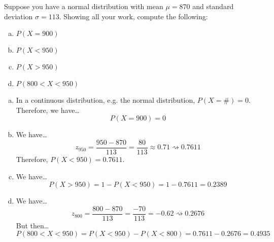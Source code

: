 \documentclass[11pt,letterpaper]{article}
\newcommand{\squiggle}{\rightsquigarrow}
\begin{document}
\newpage



 Suppose you have a normal distribution with mean $\mu= 870$ and standard deviation $\sigma= 113$. Showing all your work, compute the following:
	\begin{enumerate}[(a)]
	\item $P(X= 900)$
	\item $P(X < 950)$
	\item $P(X > 950)$
	\item $P(800 < X < 950)$
	\end{enumerate} \pspace

\sol 
\begin{enumerate}[(a)]
\item In a continuous distribution, e.g. the normal distribution, $P(X= \#)= 0$. Therefore, we have\dots
	\[
	P(X= 900)= 0 
	\] \pspace

\item We have\dots
	\[
	z_{950}= \dfrac{950 - 870}{113}= \dfrac{80}{113} \approx 0.71 \squiggle 0.7611
	\]
Therefore, $P(X < 950)= 0.7611$. \pspace

\item We have\dots
	\[
	P(X > 950)= 1 - P(X < 950)= 1 - 0.7611= 0.2389
	\] \pspace

\item We have\dots
	\[
	z_{800}= \dfrac{800 - 870}{113}= \dfrac{-70}{113}= -0.62 \squiggle 0.2676
	\]
But then\dots
	\[
	P(800 < X < 950)= P(X < 950) - P(X < 800)= 0.7611 - 0.2676= 0.4935
	\]
\end{enumerate}
\end{document}
